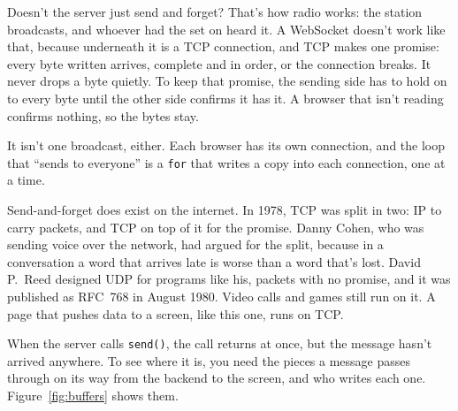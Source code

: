 \begin{question}{Doesn't the server just send and forget?}
That's how radio works: the station broadcasts, and whoever had the set on
heard it. A WebSocket doesn't work like that, because underneath it is a TCP
connection, and TCP makes one promise: every byte written arrives, complete and
in order, or the connection breaks. It never drops a byte quietly. To keep
that promise, the sending side has to hold on to every byte until the other
side confirms it has it. A browser that isn't reading confirms nothing, so the
bytes stay.

It isn't one broadcast, either. Each browser has its own connection, and the
loop that ``sends to everyone'' is a \texttt{for} that writes a copy into each
connection, one at a time.

Send-and-forget does exist on the internet. In 1978, TCP was split in two: IP
to carry packets, and TCP on top of it for the promise. Danny Cohen, who was
sending voice over the network, had argued for the split, because in a
conversation a word that arrives late is worse than a word that's lost. David
P.~Reed designed UDP for programs like his, packets with no promise, and it
was published as RFC~768 in August 1980. Video calls and games still run on it.
A page that pushes data to a screen, like this one, runs on TCP.
\end{question}

When the server calls \texttt{send()}, the call returns at once, but the
message hasn't arrived anywhere. To see where it is, you need the pieces a
message passes through on its way from the backend to the screen, and who
writes each one. Figure~\ref{fig:buffers} shows them.

